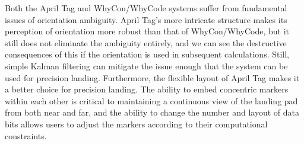 Both the April Tag and WhyCon/WhyCode systems suffer from fundamental issues of orientation ambiguity.
April Tag's more intricate structure makes its perception of orientation more robust than that of WhyCon/WhyCode,
but it still does not eliminate the ambiguity entirely, and we can see the destructive consequences of this if the
orientation is used in subsequent calculations.
Still, simple Kalman filtering can mitigate the issue enough that the system can be used for precision landing.
Furthermore, the flexible layout of April Tag makes it a better choice for precision landing.
The ability to embed concentric markers within each other is critical to maintaining a continuous view of the landing pad
from both near and far,
and the ability to change the number and layout of data bits allows users to adjust the markers according to their computational constraints.
